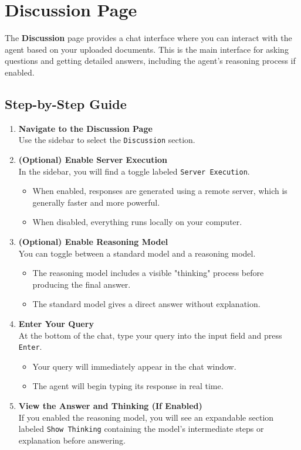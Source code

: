 \documentclass[11pt,a4paper]{report}
\begin{document}
\section{Discussion Page}



The \textbf{Discussion} page provides a chat interface where you can interact with the agent based on your uploaded documents. This is the main interface for asking questions and getting detailed answers, including the agent's reasoning process if enabled.


\subsection*{Step-by-Step Guide}

\begin{enumerate}
    \item \textbf{Navigate to the Discussion Page} \\
    Use the sidebar to select the \texttt{Discussion} section.

    \item \textbf{(Optional) Enable Server Execution} \\
    In the sidebar, you will find a toggle labeled \texttt{Server Execution}.
    \begin{itemize}
        \item When enabled, responses are generated using a remote server, which is generally faster and more powerful.
        \item When disabled, everything runs locally on your computer.
    \end{itemize}

    \item \textbf{(Optional) Enable Reasoning Model} \\
    You can toggle between a standard model and a reasoning model.
    \begin{itemize}
        \item The reasoning model includes a visible "thinking" process before producing the final answer.
        \item The standard model gives a direct answer without explanation.
    \end{itemize}

    \item \textbf{Enter Your Query} \\
    At the bottom of the chat, type your query into the input field and press \texttt{Enter}.
    \begin{itemize}
        \item Your query will immediately appear in the chat window.
        \item The agent will begin typing its response in real time.
    \end{itemize}

    \item \textbf{View the Answer and Thinking (If Enabled)} \\
    If you enabled the reasoning model, you will see an expandable section labeled \texttt{Show Thinking} containing the model’s intermediate steps or explanation before answering.
\end{enumerate}
\end{document}
